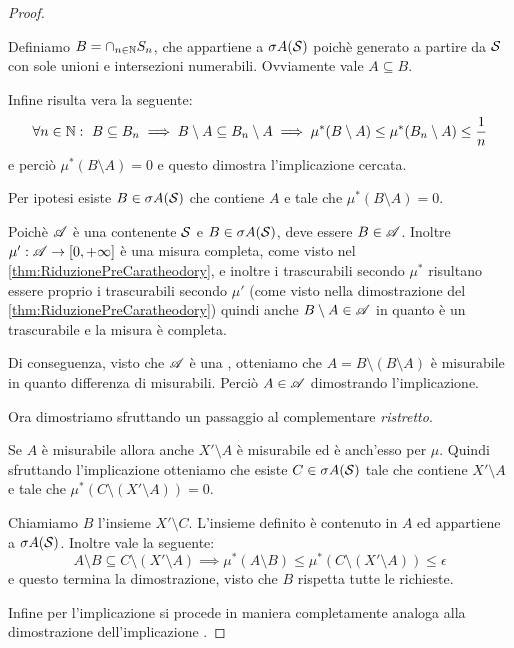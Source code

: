 \begin{proof}
\begin{description}
		Definiamo $B=\cap_{n\in\N}S_n$, che appartiene a $\sigma A(\S)$ poichè generato a partire da $\S$ con sole unioni e intersezioni numerabili. Ovviamente vale $A\subseteq B$.
		
		Infine risulta vera la seguente:
		\begin{equation*}
			\forall n\in\N:\ B\subseteq B_n\implies B\setminus A\subseteq B_n\setminus A\implies \mu^*(B\setminus A)\le \mu^*(B_n\setminus A)\le \frac1n
		\end{equation*}
		e perciò $\mu^*(B\setminus A)=0$ e questo dimostra l'implicazione cercata.
		\item[\ImplicationProof{it:SigmaDaFuoriEquivalenze}{it:MisurabileEquivalenze}] Per ipotesi esiste $B\in\sigma A(\S)$ che contiene $A$ e tale che $\mu^*(B\setminus A)=0$.
		
		Poichè $\A$ è una \sigalg{} contenente $\S$ e $B\in\sigma A(\S)$, deve essere $B\in\A$. 
		Inoltre $\mu':\A\to\Rpiu$ è una misura completa, come visto nel \cref{thm:RiduzionePreCaratheodory}, e inoltre i trascurabili secondo $\mu^*$ risultano essere proprio i trascurabili secondo $\mu'$ (come visto nella dimostrazione del \cref{thm:RiduzionePreCaratheodory}) quindi anche $B\setminus A\in \A$ in quanto è un trascurabile e la misura è completa. 
		
		Di conseguenza, visto che $\A$ è una \sigalg, otteniamo che $A=B\setminus (B\setminus A)$ è misurabile in quanto differenza di misurabili. Perciò $A\in\A$ dimostrando l'implicazione.
	\end{description}
	
	Ora dimostriamo  sfruttando un passaggio al complementare \emph{ristretto}.
	
	Se $A$ è misurabile allora anche $X'\setminus A$ è misurabile ed è anch'esso \sigfin[o] per $\mu$. Quindi sfruttando l'implicazione  otteniamo che esiste $C\in\sigma A(\S)$ tale che contiene $X'\setminus A$ e tale che $\mu^*(C\setminus(X'\setminus A))=0$. 
	
	Chiamiamo $B$ l'insieme $X'\setminus C$. L'insieme definito è contenuto in $A$ ed appartiene a $\sigma A(\S)$. Inoltre vale la seguente:
	\begin{equation*}
		A\setminus B\subseteq C\setminus (X'\setminus A) \implies \mu^*(A\setminus B)\le \mu^*\left(C\setminus(X'\setminus A)\right)\le \epsilon
	\end{equation*}
	e questo termina la dimostrazione, visto che $B$ rispetta tutte le richieste.
	
	Infine per l'implicazione  si procede in maniera completamente analoga alla dimostrazione dell'implicazione .
\end{proof}

